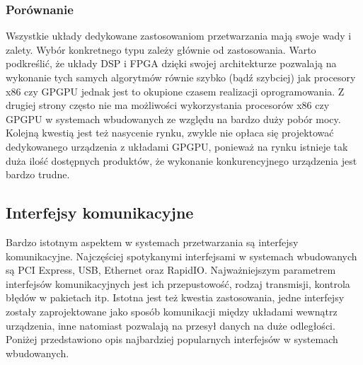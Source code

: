 \subsubsection{Porównanie}
Wszystkie układy dedykowane zastosowaniom przetwarzania mają swoje wady i zalety. Wybór konkretnego typu zależy głównie od zastosowania.
Warto podkreślić, że układy DSP i FPGA dzięki swojej architekturze pozwalają na wykonanie tych samych algorytmów równie szybko (bądź szybciej) jak procesory x86 czy GPGPU jednak jest to okupione czasem realizacji oprogramowania. Z drugiej strony często nie ma możliwości wykorzystania procesorów x86 czy GPGPU w systemach wbudowanych ze względu na bardzo duży pobór mocy. Kolejną kwestią jest też nasycenie rynku, zwykle nie opłaca się projektować dedykowanego urządzenia z układami GPGPU, ponieważ na rynku istnieje tak duża ilość dostępnych produktów, że wykonanie konkurencyjnego urządzenia jest bardzo trudne. 
%
%
 

\subsection{Interfejsy komunikacyjne}
Bardzo istotnym aspektem w systemach przetwarzania są interfejsy komunikacyjne. Najczęściej spotykanymi interfejsami w systemach wbudowanych są PCI Express, USB, Ethernet oraz RapidIO. Najważniejszym parametrem interfejsów komunikacyjnych jest ich przepustowość, rodzaj transmisji, kontrola błędów w pakietach itp. Istotna jest też kwestia zastosowania, jedne interfejsy zostały zaprojektowane jako sposób komunikacji między układami wewnątrz urządzenia, inne natomiast pozwalają na przesył danych na duże odległości. Poniżej przedstawiono opis najbardziej popularnych interfejsów w systemach wbudowanych.  

